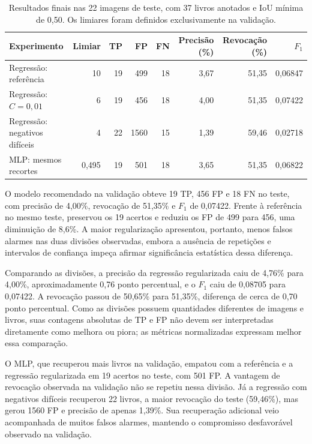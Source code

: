 \documentclass[12pt,a4paper,twocolumn]{article}
\begin{document}
\begin{table}[t]
\centering\small
\caption{Resultados finais nas 22 imagens de teste, com 37 livros anotados e IoU mínima de 0,50. Os limiares foram definidos exclusivamente na validação.}
\label{tab:teste}
\begin{tabular}{lrrrrrrr}\toprule
Experimento & Limiar & TP & FP & FN & Precisão (\%) & Revocação (\%) & $F_1$\\\midrule
Regressão: referência & 10 & 19 & 499 & 18 & 3,67 & 51,35 & 0,06847\\
Regressão: $C=0{,}01$ & 6 & 19 & 456 & 18 & 4,00 & 51,35 & 0,07422\\
Regressão: negativos difíceis & 4 & 22 & 1560 & 15 & 1,39 & 59,46 & 0,02718\\
MLP: mesmos recortes & 0,495 & 19 & 501 & 18 & 3,65 & 51,35 & 0,06822\\\bottomrule
\end{tabular}
\end{table}

O modelo recomendado na validação obteve 19 TP, 456 FP e 18 FN no teste, com precisão de 4,00\%, revocação de 51,35\% e $F_1$ de 0,07422. Frente à referência no mesmo teste, preservou os 19 acertos e reduziu os FP de 499 para 456, uma diminuição de 8,6\%. A maior regularização apresentou, portanto, menos falsos alarmes nas duas divisões observadas, embora a ausência de repetições e intervalos de confiança impeça afirmar significância estatística dessa diferença.

Comparando as divisões, a precisão da regressão regularizada caiu de 4,76\% para 4,00\%, aproximadamente 0,76 ponto percentual, e o $F_1$ caiu de 0,08705 para 0,07422. A revocação passou de 50,65\% para 51,35\%, diferença de cerca de 0,70 ponto percentual. Como as divisões possuem quantidades diferentes de imagens e livros, suas contagens absolutas de TP e FP não devem ser interpretadas diretamente como melhora ou piora; as métricas normalizadas expressam melhor essa comparação.

O MLP, que recuperou mais livros na validação, empatou com a referência e a regressão regularizada em 19 acertos no teste, com 501 FP. A vantagem de revocação observada na validação não se repetiu nessa divisão. Já a regressão com negativos difíceis recuperou 22 livros, a maior revocação do teste (59,46\%), mas gerou 1560 FP e precisão de apenas 1,39\%. Sua recuperação adicional veio acompanhada de muitos falsos alarmes, mantendo o compromisso desfavorável observado na validação.
\end{document}
